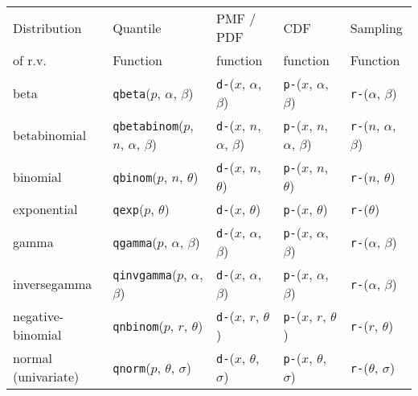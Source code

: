 \begin{table}[htp]
\centering
\small
\begin{tabular}{l | llll}
Distribution                  & Quantile  & PMF / PDF  &CDF       & Sampling  \\ 
of r.v. &  Function & function         & function &  Function \\ \hline
beta & \texttt{qbeta}($p$, $\alpha$, $\beta$)             
& \texttt{d-}($x$, $\alpha$, $\beta$)
& \texttt{p-}($x$, $\alpha$, $\beta$) 
& \texttt{r-}($\alpha$, $\beta$) \\
betabinomial & \texttt{qbetabinom}($p$, $n$, $\alpha$, $\beta$)              
& \texttt{d-}($x$, $n$, $\alpha$, $\beta$)
& \texttt{p-}($x$, $n$, $\alpha$, $\beta$) 
& \texttt{r-}($n$, $\alpha$, $\beta$) \\


binomial & \texttt{qbinom}($p$, $n$, $\theta$) 
& \texttt{d-}($x$, $n$, $\theta$)
& \texttt{p-}($x$, $n$, $\theta$) 
& \texttt{r-}($n$, $\theta$) \\

exponential & \texttt{qexp}($p$, $\theta$) 
& \texttt{d-}($x$, $\theta$) 
& \texttt{p-}($x$, $\theta$) 
& \texttt{r-}($\theta$) \\

gamma & \texttt{qgamma}($p$, $\alpha$, $\beta$) 
& \texttt{d-}($x$, $\alpha$, $\beta$)
& \texttt{p-}($x$, $\alpha$, $\beta$) 
& \texttt{r-}($\alpha$, $\beta$) \\


inversegamma & \texttt{qinvgamma}($p$, $\alpha$, $\beta$) 
& \texttt{d-}($x$, $\alpha$, $\beta$)
& \texttt{p-}($x$, $\alpha$, $\beta$) 
& \texttt{r-}($\alpha$, $\beta$) \\

negative-binomial & \texttt{qnbinom}($p$, $r$, $\theta$) 
& \texttt{d-}($x$, $r$, $\theta$) 
& \texttt{p-}($x$, $r$, $\theta$) 
& \texttt{r-}($r$, $\theta$) \\

normal (univariate) & \texttt{qnorm}($p$, $\theta$, $\sigma$) 
& \texttt{d-}($x$, $\theta$, $\sigma$)
& \texttt{p-}($x$, $\theta$, $\sigma$) 
& \texttt{r-}($\theta$, $\sigma$) \\


\end{tabular}
\end{table}
